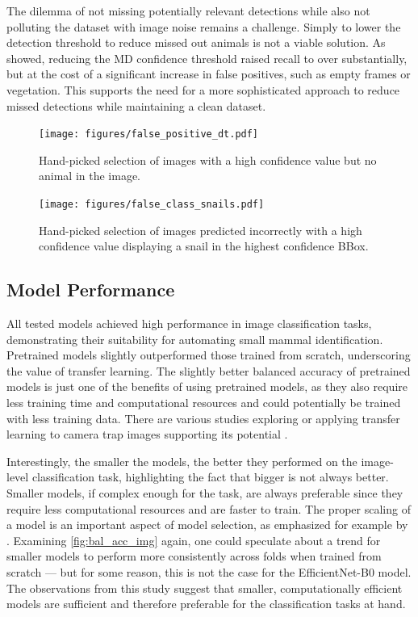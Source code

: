 The dilemma of not missing potentially relevant detections while also not polluting the dataset with image noise remains a challenge.
Simply to lower the detection threshold to reduce missed out animals is not a viable solution.
As \textcite{leornaHumanVsMachine2022} showed, reducing the \ac{MD} confidence threshold raised recall to over substantially, but at the cost of a significant increase in false positives, such as empty frames or vegetation.
This supports the need for a more sophisticated approach to reduce missed detections while maintaining a clean dataset.

\begin{figure}[ht]
\centering
\texttt{[image: figures/false\_positive\_dt.pdf]}
\caption{Hand-picked selection of images with a high confidence value but no animal in the image.}
\label{fig:false_positive_dt}
\end{figure}

\begin{figure}[ht]
\centering
\texttt{[image: figures/false\_class\_snails.pdf]}
\caption{Hand-picked selection of images predicted incorrectly with a high confidence value displaying a snail in the highest confidence BBox.}
\label{fig:false_class_snails}
\end{figure}

\subsection{Model Performance}
All tested models achieved high performance in image classification tasks, demonstrating their suitability for automating small mammal identification.
Pretrained models slightly outperformed those trained from scratch, underscoring the value of transfer learning.
The slightly better balanced accuracy of pretrained models is just one of the benefits of using pretrained models, as they also require less training time and computational resources and could potentially be trained with less training data.
There are various studies exploring or applying transfer learning to camera trap images supporting its potential \autocite{stancicClassificationEfficiencyPreTrained2022,hopkinsDetectingMonitoringRodents2024,doanWildlifeSpeciesClassification2024,rameshExploringGeneralizabilityTransfer2025}.

Interestingly, the smaller the models, the better they performed on the image-level classification task, highlighting the fact that bigger is not always better.
Smaller models, if complex enough for the task, are always preferable since they require less computational resources and are faster to train.
The proper scaling of a model is an important aspect of model selection, as emphasized for example by \textcite{tanEfficientNetRethinkingModel2019}.
Examining \autoref{fig:bal_acc_img} again, one could speculate about a trend for smaller models to perform more consistently across folds when trained from scratch --- but for some reason, this is not the case for the EfficientNet-B0 model.
The observations from this study suggest that smaller, computationally efficient models are sufficient and therefore preferable for the classification tasks at hand.

